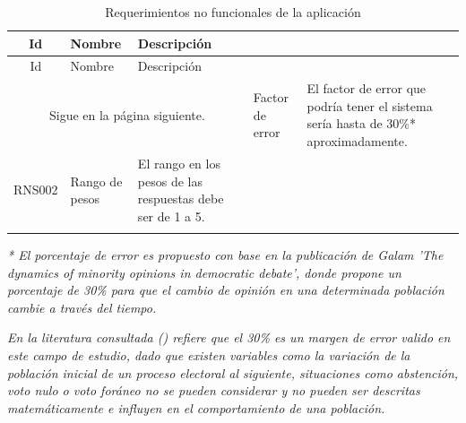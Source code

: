 \begin{longtable}{|c|m{4cm}|m{9.5cm}|}
    \hline
    \rowcolor[HTML]{3531FF} 
    {\color[HTML]{FFFFFF} Id} &{\color[HTML]{FFFFFF}Nombre} & {\color[HTML]{FFFFFF} Descripción} \\ \hline
    \endfirsthead
    \hline
    \rowcolor[HTML]{3531FF} 
    {\color[HTML]{FFFFFF} Id} &{\color[HTML]{FFFFFF}Nombre} & {\color[HTML]{FFFFFF} Descripción} \\
    \hline 
    \endhead
    \multicolumn{3}{c}{Sigue en la página siguiente.}
    \endfoot
    \endlastfoot
    RNS001&Factor de error&El factor de error que podría tener el sistema sería hasta de 30\%* aproximadamente.\\ \hline
    RNS002&Rango de pesos&El rango en los pesos de las respuestas debe ser de 1 a 5.\\ \hline
    \caption{Requerimientos no funcionales de la aplicación}
    \label{table:RNS}
\end{longtable}

\textit{* El porcentaje de error es propuesto con base en la publicación de Galam 'The dynamics of minority opinions in democratic debate', donde propone un porcentaje de 30\% para que el cambio de opinión en una determinada población cambie a través del tiempo. \cite{Galam2004}}

\textit{En la literatura consultada (\cite{Galam.1986, Galam2000, Galam2004, Galam1998, Galam2001}) refiere que el 30\% es un margen de error valido en este campo de estudio, dado que existen variables como la variación de la población inicial de un proceso electoral al siguiente, situaciones como abstención, voto nulo o voto foráneo no se pueden considerar y no pueden ser descritas matemáticamente e influyen en el comportamiento de una población.\cite{MarioH.RamirezDiaz2014}}
